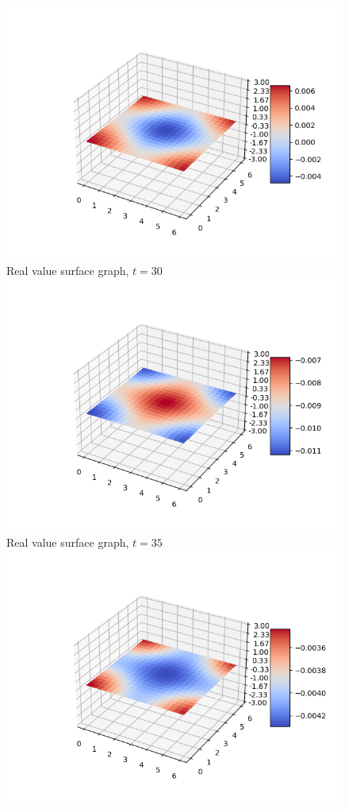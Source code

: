 \documentclass[a4paper,8pt]{article}
\begin{document}
\newpage

\begin{figure}[h!]
\begin{multicols}{2}
\centering
\includegraphics[width=1\linewidth]{t30real}\\
Real value surface graph, $t=30$
\includegraphics[width=1\linewidth]{t35real}\\
Real value surface graph, $t=35$
\includegraphics[width=1\linewidth]{t40real}\\

\end{multicols}
\end{figure}
\end{document}
